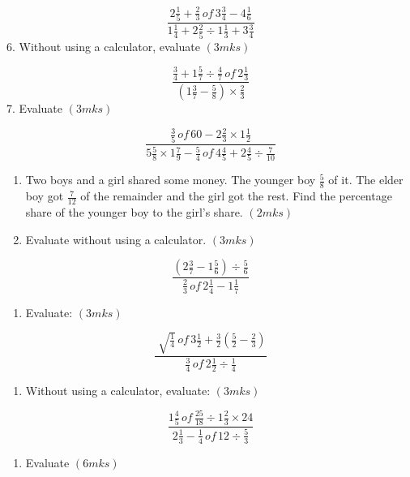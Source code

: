 \documentclass[
  a4paperpaper,
]{scrbook}
\providecommand{\tightlist}{%
  \setlength{\itemsep}{0pt}\setlength{\parskip}{0pt}}\usepackage{longtable,booktabs,array}
\begin{document}
\begin{tcolorbox}
\[
\frac{2\frac{1}{5}+\frac{2}{3}\,of\,3\frac{3}{4}-4\frac{1}{6}}{1\frac{1}{4}+2\frac{2}{5}\div 1\frac{1}{3}+3\frac{3}{4}}  
\] 6. Without using a calculator, evaluate \hspace{11.5cm} \((3mks)\)

\[
\frac{\frac{3}{4}+1\frac{5}{7}\div \frac{4}{7}\,of\, 2\frac{1}{3}}{\left (1\frac{3}{7}-\frac{5}{8}\right)\times\frac{2}{3}}  
\] 7. Evaluate \hspace{9.5cm} \((3mks)\)

\[
\frac{\frac{3}{5}\,of\,60-2\frac{2}{3}\times1\frac{1}{2}}{5\frac{5}{8}\times1\frac{7}{9}-\frac{5}{4}\,of\,4\frac{4}{5}+2\frac{4}{5}\div\frac{7}{10}} 
\]

\begin{enumerate}
\def\labelenumi{\arabic{enumi}.}
\setcounter{enumi}{7}
\item
  Two boys and a girl shared some money. The younger boy \(\frac{5}{8}\)
  of it. The elder boy got \(\frac{7}{12}\) of the remainder and the
  girl got the rest. Find the percentage share of the younger boy to the
  girl's share. \hspace{13.2cm} \((2mks)\)
\item
  Evaluate without using a calculator. \((3mks)\)
\end{enumerate}

\[
\frac{\left( 2\frac{3}{7}-1\frac{5}{6}\right)\div\frac{5}{6}}{\frac{2}{3}\,of\,2\frac{1}{4}-1\frac{1}{7}}
\]

\begin{enumerate}
\def\labelenumi{\arabic{enumi}.}
\setcounter{enumi}{9}
\tightlist
\item
  Evaluate: \((3mks)\)
\end{enumerate}

\[
\frac{\sqrt[]{\frac{1}{4}}\,of\,3\frac{1}{2}+\frac{3}{2}\left(\frac{5}{2}-\frac{2}{3}\right)}{\frac{3}{4}\,of\,2\frac{1}{2}\div\frac{1}{4}} 
\]

\begin{enumerate}
\def\labelenumi{\arabic{enumi}.}
\setcounter{enumi}{10}
\tightlist
\item
  Without using a calculator, evaluate: \((3mks)\)
\end{enumerate}

\[
\frac{1\frac{4}{5}\,of\,\frac{25}{18}\div1\frac{2}{3}\times24}{2\frac{1}{3}-\frac{1}{4}\,of\,12\div\frac{5}{3}}    
\]

\begin{enumerate}
\def\labelenumi{\arabic{enumi}.}
\setcounter{enumi}{11}
\item
  Evaluate \hspace{12.8cm} \((6mks)\)


\end{enumerate}
\end{tcolorbox}
\end{document}
